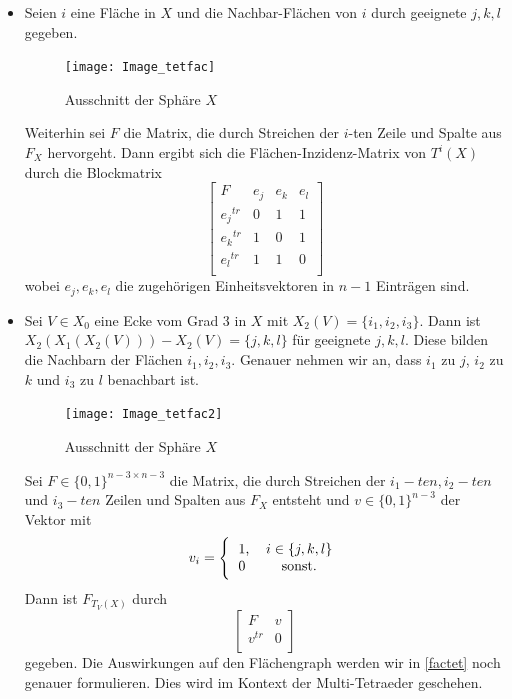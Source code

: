 \documentclass[12pt,titlepage,twoside,cleardoublepage]{article}
\theoremstyle{nummermitklammern}
\numberwithin{equation}{section}
\begin{document}
\begin{enumerate}
\begin{itemize}  
\item Seien $i$ eine Fläche in $X$ und die Nachbar-Flächen von $i$ durch geeignete $j,k,l$ gegeben.
\begin{figure}[H]
\begin{center}
\texttt{[image: Image\_tetfac]}
\end{center}
\caption{Ausschnitt der Sphäre $X$}
\end{figure}
Weiterhin sei $F$ die Matrix, die durch Streichen der $i$-ten Zeile und Spalte aus $F_X$ hervorgeht. Dann ergibt sich die Flächen-Inzidenz-Matrix von $T^i(X)$ durch die Blockmatrix
\[
\left[ 
\begin{array}{c|ccc} 
  F & e_j& e_k &e_l \\ 
  \hline 
  {e_j}^{tr} & 0 & 1 & 1  \\
  {e_k}^{tr} & 1 & 0 & 1 \\
  {e_l}^{tr} & 1 & 1 & 0 \\
\end{array} 
\right]
\]
wobei $e_j,e_k,e_l$ die zugehörigen Einheitsvektoren in $n-1$ Einträgen sind. 
\item Sei $V\in X_0$ eine Ecke vom Grad 3 in $X$ mit $X_2(V)=\{i_1,i_2,i_3\}.$ Dann ist $X_2(X_1(X_2(V)))-X_2(V)=\{j,k,l\}$ für geeignete $j,k,l$. Diese bilden die Nachbarn der Flächen $i_1,i_2,i_3.$ Genauer nehmen wir an, dass $i_1$ zu $j$, $i_2$ zu $k$ und $i_3$ zu $l$ benachbart ist.
\begin{figure}[H]
\begin{center}
\texttt{[image: Image\_tetfac2]}
\end{center}
\caption{Ausschnitt der Sphäre $X$}
\end{figure}  
Sei $F\in \{0,1\}^{n-3\times n-3}$ die Matrix, die durch Streichen der $i_1-ten,i_2-ten$ und $i_3-ten$ Zeilen und Spalten  aus $F_X$ entsteht und $v\in \{0,1\}^{n-3}$ der Vektor mit
\[
v_{i}=
\Biggl{\{\begin{tabular}[l]{lcr}
1,&\textcolor{black}{$i\in \{j,k,l\}$} \\
0& sonst.\\
\end{tabular}}
\] Dann ist $F_{T_V(X)}$ durch 
\[
\left[ 
\begin{array}{c|ccc} 
  F & v \\ 
  \hline 
  {v}^{tr} & 0\\
\end{array} 
\right]
\]
gegeben.
Die Auswirkungen auf den Flächengraph werden wir in \ref{factet} noch genauer formulieren. Dies wird im Kontext der Multi-Tetraeder geschehen.
\end{itemize}
\end{enumerate}
\end{document}
